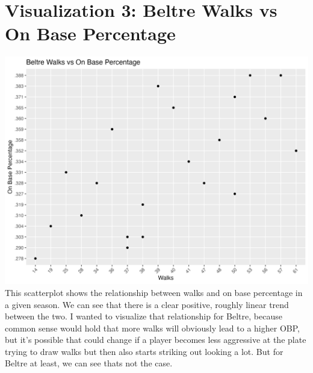 \documentclass{article}
\begin{document}
\section{Visualization 3: Beltre Walks vs On Base Percentage}
    \centering
    \includegraphics[width=15cm]{PS6c_Felkner.png}
This scatterplot shows the relationship between walks and on base percentage in a given season. We can see that there is a clear positive, roughly linear trend between the two. I wanted to visualize that relationship for Beltre, because common sense would hold  that more walks will obviously lead to a higher OBP, but it's possible that could change if a player becomes less aggressive at the plate trying to draw walks but then also starts striking out looking a lot. But for Beltre at least, we can see thats not the case.
\end{document}
